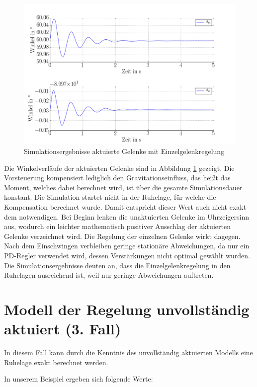 \begin{figure}[h]
\centering
\includegraphics[width=1\linewidth]{RuhelageGelenkQ1Q2.png}
\caption{Simulationsergebnisse aktuierte Gelenke mit Einzelgelenkregelung}
\label{fig:RuhelageGelenkQ1Q2}
\end{figure}

Die Winkelverläufe der aktuierten Gelenke sind in Abbildung \ref{fig:RuhelageGelenkQ1Q2} gezeigt. Die Vorsteuerung kompensiert lediglich den Gravitationseinfluss, das heißt das Moment, welches dabei berechnet wird, ist über die gesamte Simulationsdauer konstant. Die Simulation startet nicht in der Ruhelage, für welche die Kompensation berechnet wurde. Damit entspricht dieser Wert auch nicht exakt dem notwendigen. Bei Beginn lenken die unaktuierten Gelenke im Uhrzeigersinn aus, wodurch ein leichter mathematisch positiver Ausschlag der aktuierten Gelenke verzeichnet wird. Die Regelung der einzelnen Gelenke wirkt dagegen. Nach dem Einschwingen verbleiben geringe stationäre Abweichungen, da nur ein PD-Regler verwendet wird, dessen Verstärkungen nicht optimal gewählt wurden. Die Simulationsergebnisse deuten an, dass die Einzelgelenkregelung in den Ruhelagen ausreichend ist, weil nur geringe Abweichungen auftreten.
 
\section{Modell der Regelung unvollständig aktuiert (3. Fall)}

In diesem Fall kann durch die Kenntnis des unvollständig aktuierten Modells eine Ruhelage exakt berechnet werden. 

In unserem Beispiel ergeben sich folgende Werte:

